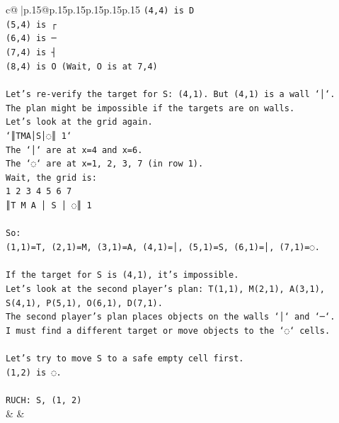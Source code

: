 \documentclass{article}
\begin{document}
{\begin{supertabular}{c@{$\;$}|p{.15\linewidth}@{}p{.15\linewidth}p{.15\linewidth}p{.15\linewidth}p{.15\linewidth}p{.15\linewidth}}
{{{\texttt{(4,4) is D} \\
\texttt{(5,4) is ┌} \\
\texttt{(6,4) is ─} \\
\texttt{(7,4) is ┤} \\
\texttt{(8,4) is O (Wait, O is at 7,4)} \\
\\ 
\texttt{Let's re{-}verify the target for S: (4,1). But (4,1) is a wall `│`.} \\
\texttt{The plan might be impossible if the targets are on walls.} \\
\texttt{Let's look at the grid again.} \\
\texttt{`║TMA│S│◌║ 1`} \\
\texttt{The `│` are at x=4 and x=6.} \\
\texttt{The `◌` are at x=1, 2, 3, 7 (in row 1).} \\
\texttt{Wait, the grid is:} \\
\texttt{1 2 3 4 5 6 7} \\
\texttt{║T M A │ S │ ◌║ 1} \\
\\ 
\texttt{So:} \\
\texttt{(1,1)=T, (2,1)=M, (3,1)=A, (4,1)=│, (5,1)=S, (6,1)=│, (7,1)=◌.} \\
\\ 
\texttt{If the target for S is (4,1), it's impossible.} \\
\texttt{Let's look at the second player's plan: T(1,1), M(2,1), A(3,1), S(4,1), P(5,1), O(6,1), D(7,1).} \\
\texttt{The second player's plan places objects on the walls `│` and `─`.} \\
\texttt{I must find a different target or move objects to the `◌` cells.} \\
\\ 
\texttt{Let's try to move S to a safe empty cell first.} \\
\texttt{(1,2) is ◌.} \\
\\ 
\texttt{RUCH: S, (1, 2)} \\
            }
        }
    }
    & & \\ \\


\end{supertabular}}
\end{document}
